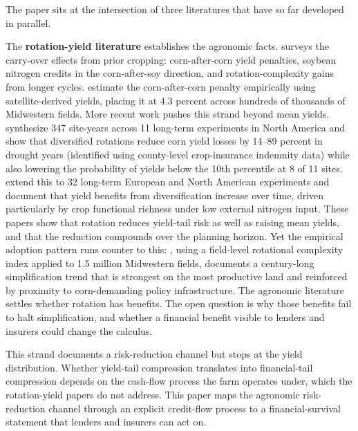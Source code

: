 \documentclass[11pt,letterpaper]{article}
\theoremstyle{remark}
\begin{document}
The paper sits at the intersection of three literatures that have so far developed in parallel.
 
The \textbf{rotation-yield literature} establishes the agronomic facts. \citet{Bullock1992} surveys the carry-over effects from prior cropping: corn-after-corn yield penalties, soybean nitrogen credits in the corn-after-soy direction, and rotation-complexity gains from longer cycles. \citet{Seifert2017} estimate the corn-after-corn penalty empirically using satellite-derived yields, placing it at 4.3 percent across hundreds of thousands of Midwestern fields. More recent work pushes this strand beyond mean yields. \citet{Bowles2020} synthesize 347 site-years across 11 long-term experiments in North America and show that diversified rotations reduce corn yield losses by 14--89 percent in drought years (identified using county-level crop-insurance indemnity data) while also lowering the probability of yields below the 10th percentile at 8 of 11 sites. \citet{Smith2023} extend this to 32 long-term European and North American experiments and document that yield benefits from diversification increase over time, driven particularly by crop functional richness under low external nitrogen input. These papers show that rotation reduces yield-tail risk as well as raising mean yields, and that the reduction compounds over the planning horizon. Yet the empirical adoption pattern runs counter to this: \citet{socolar2021}, using a field-level rotational complexity index applied to 1.5 million Midwestern fields, documents a century-long simplification trend that is strongest on the most productive land and reinforced by proximity to corn-demanding policy infrastructure. The agronomic literature settles whether rotation has benefits. The open question is why those benefits fail to halt simplification, and whether a financial benefit visible to lenders and insurers could change the calculus.
 
This strand documents a risk-reduction channel but stops at the yield distribution. Whether yield-tail compression translates into financial-tail compression depends on the cash-flow process the farm operates under, which the rotation-yield papers do not address. This paper maps the agronomic risk-reduction channel through an explicit credit-flow process to a financial-survival statement that lenders and insurers can act on.
 
\end{document}
